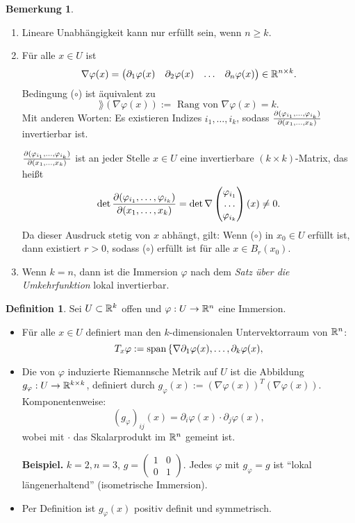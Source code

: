 \documentclass[
 a4paper,
 12pt,
 parskip=half
 ]{scrartcl}
\theoremstyle{plain}
\theoremstyle{definition}
\newtheorem*{defn}{Definition}
\newtheorem*{rmrk}{Bemerkung}
\numberwithin{equation}{section}
\begin{document}
\begin{rmrk}
 \begin{enumerate}
  \item Lineare Unabhängigkeit kann nur erfüllt sein, wenn $n \ge k$.
  \item Für alle $x \in U$ ist 
   \[ \nabla\varphi(x) = \begin{pmatrix} \partial_1 \varphi(x) & \partial_2 \varphi(x) & \ldots & \partial_n \varphi(x) \end{pmatrix} \in \mathbb{R}^{n \times k}.\]
   Bedingung ($\circ$) ist äquivalent zu
   \[ \rang( \nabla \varphi(x) ) := \text{ Rang von } \nabla \varphi(x) = k. \]
   Mit anderen Worten: Es existieren Indizes $i_1, \ldots, i_k$, sodass $\frac{\partial (\varphi_{i_1}, \ldots, \varphi_{i_k})}{\partial (x_1, \ldots, x_k)}$ invertierbar ist.
   
   $\frac{\partial (\varphi_{i_1}, \ldots, \varphi_{i_k})}{\partial (x_1, \ldots, x_k)}$ ist an jeder Stelle $x \in U$ eine invertierbare $(k \times k)$-Matrix, das heißt 
   \[ \det \frac{\partial (\varphi_{i_1}, \ldots, \varphi_{i_k})}{\partial (x_1, \ldots, x_k)} = \det \nabla \begin{pmatrix} \varphi_{i_1} \\ \ldots \\ \varphi_{i_k} \end{pmatrix}(x) \ne 0. \]
   Da dieser Ausdruck stetig von $x$ abhängt, gilt: Wenn ($\circ$) in $x_0 \in U$ erfüllt ist, dann existiert $r > 0$, sodass ($\circ$) erfüllt ist für alle $x \in B_r(x_0)$.
  \item Wenn $k=n$, dann ist die Immersion $\varphi$ nach dem \emph{Satz über die Umkehrfunktion} lokal invertierbar.
 \end{enumerate}
\end{rmrk}

\begin{defn}
 Sei $U \subset \mathbb{R}^k$ offen und $\varphi: U \to \mathbb{R}^n$ eine Immersion.
 \begin{itemize}
  \item Für alle $x \in U$ definiert man den $k$-dimensionalen Untervektorraum von $\mathbb{R}^n$:
  \[ T_x \varphi := \mathrm{span}\, \{ \nabla \partial_1 \varphi(x), \ldots, \partial_k \varphi(x), \]
 \item Die von $\varphi$ induzierte Riemannsche Metrik auf $U$ ist die Abbildung $g_\varphi: U \to \mathbb{R}^{k \times k}$, definiert durch $g_\varphi(x) := (\nabla \varphi(x))^T (\nabla \varphi(x))$. Komponentenweise:
  \[ (g_\varphi)_{ij}(x) = \partial_i \varphi(x) \cdot \partial_j \varphi(x), \]
  wobei mit $\cdot$ das Skalarprodukt im $\mathbb{R}^n$ gemeint ist.
 
  \textbf{Beispiel.} $k=2, n=3$, $g = \begin{pmatrix} 1 & 0 \\ 0 & 1 \end{pmatrix}$. Jedes $\varphi$ mit $g_\varphi = g$ ist ``lokal längenerhaltend'' (isometrische Immersion).
 \item Per Definition ist $g_\varphi(x)$ positiv definit und symmetrisch.
 \end{itemize}
\end{defn}
\end{document}
